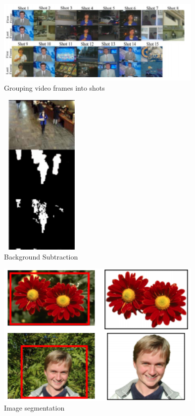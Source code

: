 \documentclass{article}
\begin{document}
\begin{figure}[htp]
    \centering
    \includegraphics[width=10cm]{slide_5_2}
    \caption{Grouping video frames into shots}
    \label{fig:Slide5_2}
\end{figure}


\begin{figure}[htp]
    \centering
    \includegraphics[width=4cm,height=8cm]{slide_5_1}
    \caption{Background Subtraction}
    \label{fig:Slide5_1}
\end{figure}

\begin{figure}[htp]
    \centering
    \includegraphics[width=10cm]{slide_5_4}
    \caption{Image segmentation}
    \label{fig:Slide5_4}
\end{figure}
\end{document}
